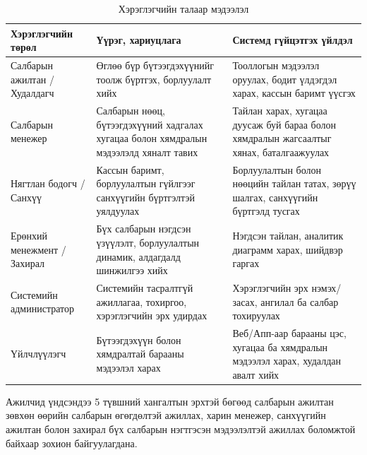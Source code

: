 \begin{table}
    \centering
    \begin{tabular}{p{3cm}p{5cm}p{5.5cm}}
        \toprule
        \textbf{Хэрэглэгчийн төрөл } &
        \textbf{Үүрэг, хариуцлага} &
        \textbf{Системд гүйцэтгэх үйлдэл} \\
        \midrule 
        Салбарын ажилтан /   Худалдагч  &
        Өглөө бүр бүтээгдэхүүнийг тоолж бүртгэх, борлуулалт хийх  &
        Тооллогын мэдээлэл оруулах, бодит үлдэгдэл харах, кассын баримт үүсгэх  \\
        
        Салбарын   менежер  &
        Салбарын нөөц, бүтээгдэхүүний хадгалах хугацаа болон хямдралын мэдээлэлд хяналт тавих &
        Тайлан харах, хугацаа дуусаж буй бараа болон хямдралын жагсаалтыг хянах, баталгаажуулах  \\
        
        Нягтлан бодогч / Санхүү  &
        Кассын баримт, борлуулалтын гүйлгээг санхүүгийн бүртгэлтэй уялдуулах &
        Борлуулалтын болон нөөцийн тайлан татах, зөрүү шалгах, санхүүгийн бүртгэлд тусгах \\
        Ерөнхий менежмент / Захирал  &
        Бүх салбарын нэгдсэн үзүүлэлт, борлуулалтын динамик, алдагдалд шинжилгээ хийх  &
        Нэгдсэн тайлан, аналитик диаграмм харах, шийдвэр гаргах  \\
        
        Системийн администратор  &
        Системийн тасралтгүй ажиллагаа, тохиргоо, хэрэглэгчийн эрх удирдах &
        Хэрэглэгчийн эрх нэмэх/засах, ангилал ба салбар тохируулах \\
        
        Үйлчлүүлэгч  &
        Бүтээгдэхүүн болон хямдралтай барааны мэдээлэл харах  &
        Веб/Апп-аар барааны цэс, хугацаа ба хямдралын мэдээлэл харах, худалдан авалт хийх  \\
        \bottomrule

    \end{tabular}
    \caption{Хэрэглэгчийн талаар мэдээлэл}
    \label{tab:users}
\end{table}

Ажилчид үндсэндээ 5 түвшний хангалтын эрхтэй бөгөөд салбарын ажилтан зөвхөн өөрийн салбарын өгөгдөлтэй ажиллах, харин менежер, санхүүгийн ажилтан болон захирал бүх салбарын нэгтгэсэн мэдээлэлтэй ажиллах боломжтой байхаар зохион байгуулагдана. 

